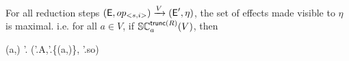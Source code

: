 %
%
\begin{theorem}
\label{theorem:two}
For all reduction steps
{\footnotesize $
({\normalfont \textsf{E}},op_{<s,i>}) 
    \xrightarrow{V}
  ({\normalfont \textsf{E}}',\eta) 
$},
the set of effects made visible to $\eta$ is maximal. i.e. for all
 {\footnotesize $a \in V$}, if 
 {\footnotesize $ \SC {\trunc{R}} a V$}, then 
\begin{fmathpar}
(a,\eta) \not\in \E'.\visZ \Rightarrow 
(\E'.A,\E'.\visZ \cup \{(a,\eta)\}, \E'.so) \not\models \psi[\eta/\hat{\eta}]
\end{fmathpar}
\end{theorem}

